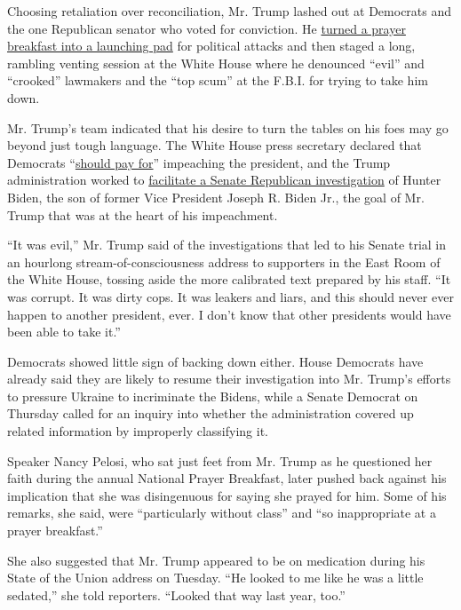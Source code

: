 Choosing retaliation over reconciliation, Mr. Trump lashed out at
Democrats and the one Republican senator who voted for conviction. He
\href{https://www.nytimes.com/2020/02/06/us/politics/trump-prayer-impeachment.html}{turned
a prayer breakfast into a launching pad} for political attacks and then
staged a long, rambling venting session at the White House where he
denounced ``evil'' and ``crooked'' lawmakers and the ``top scum'' at the
F.B.I. for trying to take him down.

Mr. Trump's team indicated that his desire to turn the tables on his
foes may go beyond just tough language. The White House press secretary
declared that Democrats
``\href{https://www.foxnews.com/media/stephanie-grisham-dems-must-be-held-accountable-for-corrupt-impeachment}{should
pay for}'' impeaching the president, and the Trump administration worked
to
\href{https://www.nytimes.com/2020/02/06/us/politics/hunter-biden-investigation.html}{facilitate
a Senate Republican investigation} of Hunter Biden, the son of former
Vice President Joseph R. Biden Jr., the goal of Mr. Trump that was at
the heart of his impeachment.

``It was evil,'' Mr. Trump said of the investigations that led to his
Senate trial in an hourlong stream-of-consciousness address to
supporters in the East Room of the White House, tossing aside the more
calibrated text prepared by his staff. ``It was corrupt. It was dirty
cops. It was leakers and liars, and this should never ever happen to
another president, ever. I don't know that other presidents would have
been able to take it.''

Democrats showed little sign of backing down either. House Democrats
have already said they are likely to resume their investigation into Mr.
Trump's efforts to pressure Ukraine to incriminate the Bidens, while a
Senate Democrat on Thursday called for an inquiry into whether the
administration covered up related information by improperly classifying
it.

Speaker Nancy Pelosi, who sat just feet from Mr. Trump as he questioned
her faith during the annual National Prayer Breakfast, later pushed back
against his implication that she was disingenuous for saying she prayed
for him. Some of his remarks, she said, were ``particularly without
class'' and ``so inappropriate at a prayer breakfast.''

She also suggested that Mr. Trump appeared to be on medication during
his State of the Union address on Tuesday. ``He looked to me like he was
a little sedated,'' she told reporters. ``Looked that way last year,
too.''


